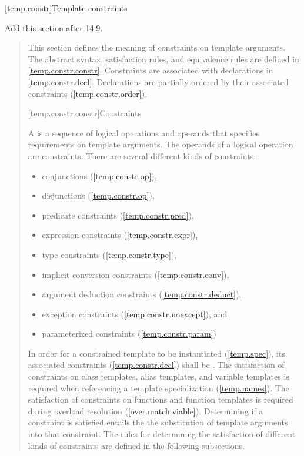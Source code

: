 
[temp.constr]{Template constraints}

Add this section after 14.9.

\begin{quote}

\pnum
\enternote
This section defines the meaning of constraints on template arguments.
% 
The abstract syntax, satisfaction rules, and equivalence rules are defined
in \ref{temp.constr.constr}. 
% 
Constraints are associated with declarations in \ref{temp.constr.decl}.
% 
Declarations are partially ordered by their associated constraints 
(\ref{temp.constr.order}).
\exitnote


[temp.constr.constr]{Constraints}

\pnum
A  is a sequence of logical operations and 
operands that specifies requirements on template arguments.
\enternote The operands of a logical operation are constraints. \exitnote
% 
There are several different kinds of constraints:
\begin{itemize}
\item conjunctions (\ref{temp.constr.op}),
\item disjunctions (\ref{temp.constr.op}),
\item predicate constraints (\ref{temp.constr.pred}),
\item expression constraints (\ref{temp.constr.expr}),
\item type constraints (\ref{temp.constr.type}),
\item implicit conversion constraints (\ref{temp.constr.conv}),
\item argument deduction constraints (\ref{temp.constr.deduct}),
\item exception constraints (\ref{temp.constr.noexcept}), and
\item parameterized constraints (\ref{temp.constr.param})
\end{itemize}

\pnum
In order for a constrained template to be instantiated (\ref{temp.spec}), its 
associated constraints (\ref{temp.constr.decl}) shall be .
% 
\enternote
The satisfaction of constraints on class templates, alias templates, 
and variable templates is required when referencing a template specialization 
(\ref{temp.names}). The satisfaction of constraints on functions and
function templates is required during overload resolution (\ref{over.match.viable}).
\exitnote
% 
Determining if a constraint is satisfied entails the the substitution 
of template arguments into that constraint.
% 
The rules for determining the satisfaction of different kinds of 
constraints are defined in the following subsections.


\end{quote}
